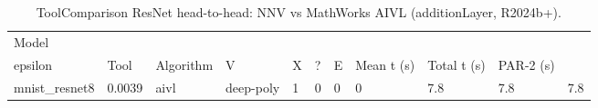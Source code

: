 \begin{table}[t]
\centering
\caption{ToolComparison ResNet head-to-head: NNV vs MathWorks AIVL (additionLayer, R2024b+).}
\label{tab:toolcomparison-mnist-resnet}
\begin{tabular}{lllllllllll}
\toprule
Model & \\epsilon & Tool & Algorithm & V & X & ? & E & Mean t (s) & Total t (s) & PAR-2 (s) \\
\midrule
mnist_resnet8 & 0.0039 & aivl & deep-poly & 1 & 0 & 0 & 0 & 7.8 & 7.8 & 7.8 \\
\bottomrule
\end{tabular}
\end{table}
